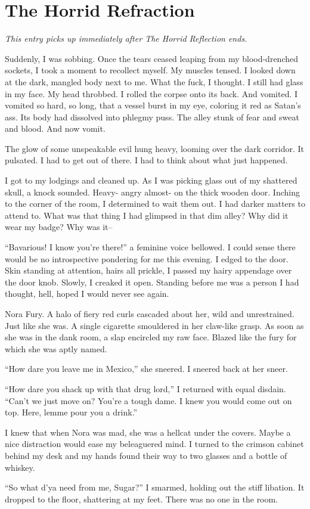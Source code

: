 \chapter{The Horrid Refraction}


{\em This entry picks up immediately after {\rm The Horrid Reflection}
ends.}


Suddenly, I was sobbing. Once the tears ceased leaping from my
blood-drenched sockets, I took a moment to recollect myself. My
muscles tensed. I looked down at the dark, mangled body next to me.
What the fuck, I thought. I still had glass in my face. My head
throbbed. I rolled the corpse onto its back. And vomited. I vomited
so hard, so long, that a vessel burst in my eye, coloring it red as
Satan's ass. Its body had dissolved into phlegmy puss. The alley
stunk of fear and sweat and blood. And now vomit.

The glow of some unspeakable evil hung heavy, looming over the dark
corridor. It pulsated. I had to get out of there. I had to think
about what just happened.

I got to my lodgings and cleaned up. As I was picking glass out of
my shattered skull, a knock sounded. Heavy- angry almost- on the
thick wooden door. Inching to the corner of the room, I determined
to wait them out. I had darker matters to attend to. What was that
thing I had glimpsed in that dim alley? Why did it wear my badge?
Why was it--

``Bavarious! I know you're there!'' a feminine voice bellowed. I
could sense there would be no introspective pondering for me this
evening. I edged to the door. Skin standing at attention, hairs all
prickle, I passed my hairy appendage over the door knob. Slowly, I
creaked it open. Standing before me was a person I had thought,
hell, hoped I would never see again.

Nora Fury. A halo of fiery red curls cascaded about her, wild and
unrestrained. Just like she was. A single cigarette smouldered in
her claw-like grasp. As soon as she was in the dank room, a slap
encircled my raw face. Blazed like the fury for which she was aptly
named.

``How dare you leave me in Mexico,'' she sneered. I sneered back at
her sneer.

``How dare you shack up with that drug lord,'' I returned with equal
disdain. ``Can't we just move on? You're a tough dame. I knew you
would come out on top. Here, lemme pour you a drink.''

I knew that when Nora was mad, she was a hellcat under the covers.
Maybe a nice distraction would ease my beleaguered mind. I turned
to the crimson cabinet behind my desk and my hands found their way
to two glasses and a bottle of whiskey.

``So what d'ya need from me, Sugar?'' I smarmed, holding out the
stiff libation. It dropped to the floor, shattering at my feet.
There was no one in the room.
 



